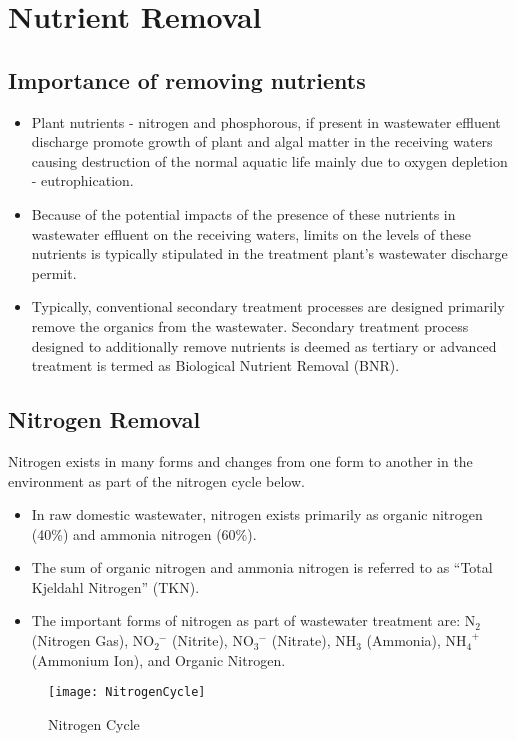 




\chapter{Nutrient Removal}

\section{Importance of removing nutrients}
\begin{itemize}
\item Plant nutrients - nitrogen and phosphorous, if present in wastewater effluent discharge promote growth of plant and algal matter in the receiving waters causing destruction of the normal aquatic life mainly due to oxygen depletion - eutrophication.

\item Because of the potential impacts of the presence of these nutrients in wastewater effluent on the receiving waters,  limits on the levels of these nutrients is typically stipulated in the treatment plant's wastewater discharge permit.

\item Typically, conventional secondary treatment processes are designed primarily remove the organics from the wastewater.  Secondary treatment process designed to additionally remove nutrients is deemed as tertiary or advanced treatment is termed as Biological Nutrient Removal (BNR).
\end{itemize}

\section{Nitrogen Removal}

Nitrogen exists in many forms and changes from one form to another in the environment as part of the nitrogen cycle below.

	\begin{itemize}
		\item In raw domestic wastewater, nitrogen exists primarily as organic nitrogen (40\%) and ammonia nitrogen (60\%). 
		\item The sum of organic nitrogen and ammonia nitrogen is referred to as “Total Kjeldahl Nitrogen” (TKN).  
		\item The important forms of nitrogen as part of wastewater treatment are: N$_2$ (Nitrogen Gas), NO$_2^{\enspace -}$ (Nitrite), NO$_3^{\enspace -}$ (Nitrate), NH$_3$ (Ammonia), NH$_4^{\enspace +}$ (Ammonium Ion), and Organic Nitrogen. 
	\end{itemize}
\begin{figure}[h]
	\begin{center}
	\texttt{[image: NitrogenCycle]}
	\caption{Nitrogen Cycle}
		\end{center}
\end{figure}

